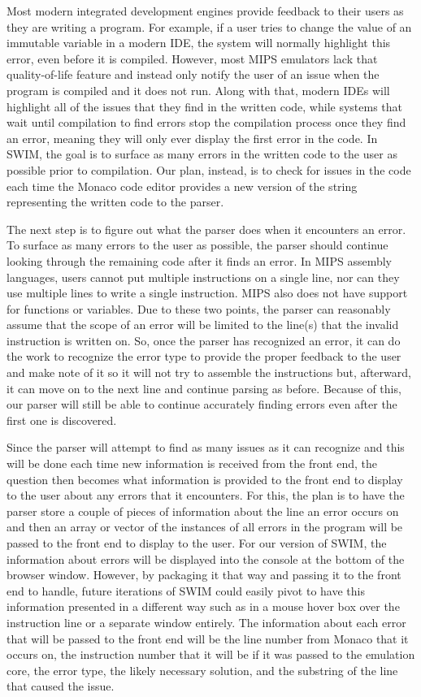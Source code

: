 \documentclass[
    parskip=half,
    fontsize=12pt,
    titlepage=firstiscover,
    toc=bibliography,
    numbers=endperiod
]{scrartcl}
\begin{document}
Most modern integrated development engines provide feedback to their
users as they are writing a program. For example, if a user tries to
change the value of an immutable variable in a modern IDE, the system
will normally highlight this error, even before it is compiled. However,
most MIPS emulators lack that quality-of-life feature and instead only
notify the user of an issue when the program is compiled and it does not
run. Along with that, modern IDEs will highlight all of the issues that
they find in the written code, while systems that wait until compilation
to find errors stop the compilation process once they find an error,
meaning they will only ever display the first error in the code. In
SWIM, the goal is to surface as many errors in the written code to the
user as possible prior to compilation. Our plan, instead, is to check
for issues in the code each time the Monaco code editor provides a new
version of the string representing the written code to the parser.

The next step is to figure out what the parser does when it encounters
an error. To surface as many errors to the user as possible, the parser
should continue looking through the remaining code after it finds an
error. In MIPS assembly languages, users cannot put multiple
instructions on a single line, nor can they use multiple lines to write
a single instruction. MIPS also does not have support for functions or
variables. Due to these two points, the parser can reasonably assume
that the scope of an error will be limited to the line(s) that the
invalid instruction is written on. So, once the parser has recognized an
error, it can do the work to recognize the error type to provide the
proper feedback to the user and make note of it so it will not try to
assemble the instructions but, afterward, it can move on to the next
line and continue parsing as before. Because of this, our parser will
still be able to continue accurately finding errors even after the first
one is discovered.

Since the parser will attempt to find as many issues as it can recognize
and this will be done each time new information is received from the
front end, the question then becomes what information is provided to the
front end to display to the user about any errors that it encounters.
For this, the plan is to have the parser store a couple of pieces of
information about the line an error occurs on and then an array or
vector of the instances of all errors in the program will be passed to
the front end to display to the user. For our version of SWIM, the
information about errors will be displayed into the console at the
bottom of the browser window. However, by packaging it that way and
passing it to the front end to handle, future iterations of SWIM could
easily pivot to have this information presented in a different way such
as in a mouse hover box over the instruction line or a separate window
entirely. The information about each error that will be passed to the
front end will be the line number from Monaco that it occurs on, the
instruction number that it will be if it was passed to the emulation
core, the error type, the likely necessary solution, and the substring
of the line that caused the issue.
\end{document}
